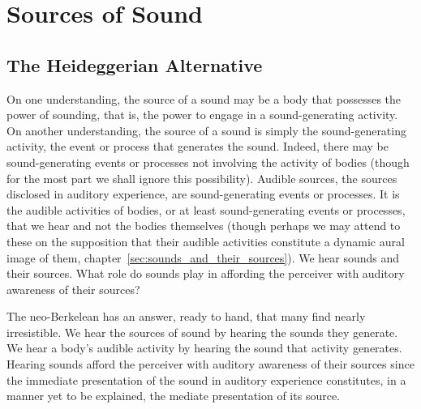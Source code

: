 \chapter{Sources of Sound} %
\label{cha:sources_of_sound}

\section{The Heideggerian Alternative} %
\label{sec:the_heideggerian_alternative}

On one understanding, the source of a sound may be a body that possesses the power of sounding, that is, the power to engage in a sound-generating activity. On another understanding, the source of a sound is simply the sound-generating activity, the event or process that generates the sound. Indeed, there may be sound-generating events or processes not involving the activity of bodies (though for the most part we shall ignore this possibility). Audible sources, the sources disclosed in auditory experience, are sound-generating events or processes. It is the audible activities of bodies, or at least sound-generating events or processes, that we hear and not the bodies themselves (though perhaps we may attend to these on the supposition that their audible activities constitute a dynamic aural image of them, chapter~\ref{sec:sounds_and_their_sources}). We hear sounds and their sources. What role do sounds play in affording the perceiver with auditory awareness of their sources?

The neo-Berkelean has an answer, ready to hand, that many find nearly irresistible. We hear the sources of sound by hearing the sounds they generate. We hear a body's audible activity by hearing the sound that activity generates. Hearing sounds afford the perceiver with auditory awareness of their sources since the immediate presentation of the sound in auditory experience constitutes, in a manner yet to be explained, the mediate presentation of its source.

